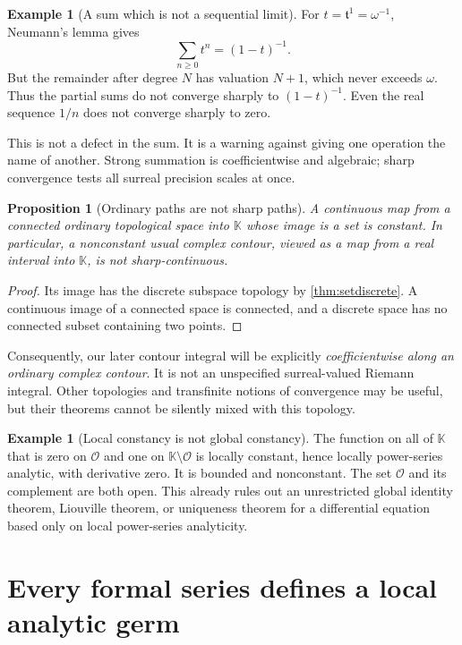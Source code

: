 \documentclass[11pt,a4paper]{article}
\numberwithin{equation}{section}
\newtheorem{proposition}[theorem]{Proposition}
\theoremstyle{definition}
\newtheorem{example}[theorem]{Example}
\newcommand{\K}{\mathbb K}
\newcommand{\tmon}{\mathfrak t}
\newcommand{\OO}{\mathcal O}
\begin{document}
\begin{example}[A sum which is not a sequential limit]\label{ex:geom}
For $t=\tmon^1=\omega^{-1}$, Neumann's lemma gives
\[
 \sum_{n\geq0}t^n=(1-t)^{-1}.
\]
But the remainder after degree $N$ has valuation $N+1$, which never exceeds
$\omega$. Thus the partial sums do not converge sharply to $(1-t)^{-1}$.
Even the real sequence $1/n$ does not converge sharply to zero.
\end{example}

This is not a defect in the sum. It is a warning against giving one operation
the name of another. Strong summation is coefficientwise and algebraic;
sharp convergence tests all surreal precision scales at once.

\begin{proposition}[Ordinary paths are not sharp paths]\label{prop:paths}
A continuous map from a connected ordinary topological space into $\K$ whose
image is a set is constant. In particular, a nonconstant usual complex contour,
viewed as a map from a real interval into $\K$, is not sharp-continuous.
\end{proposition}
\begin{proof}
Its image has the discrete subspace topology by \cref{thm:setdiscrete}.
A continuous image of a connected space is connected, and a discrete space
has no connected subset containing two points.
\end{proof}

Consequently, our later contour integral will be explicitly \emph{coefficientwise
along an ordinary complex contour}. It is not an unspecified surreal-valued
Riemann integral. Other topologies and transfinite notions of convergence may
be useful, but their theorems cannot be silently mixed with this topology.

\begin{example}[Local constancy is not global constancy]\label{ex:indicator}
The function on all of $\K$ that is zero on $\OO$ and one on $\K\setminus\OO$
is locally constant, hence locally power-series analytic, with derivative zero.
It is bounded and nonconstant. The set $\OO$ and its complement are both open.
This already rules out an unrestricted global identity theorem, Liouville
theorem, or uniqueness theorem for a differential equation based only on
local power-series analyticity.
\end{example}

\section{Every formal series defines a local analytic germ}
\end{document}
